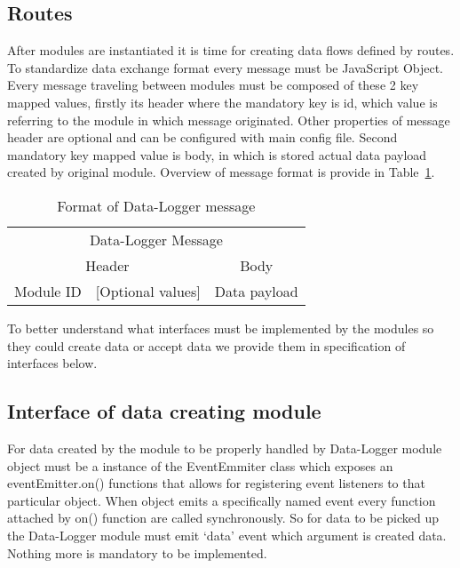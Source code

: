 \subsection{Routes} %
\label{sub:routes}
After modules are instantiated it is time for creating data flows defined by routes. To standardize data exchange format every message must be JavaScript Object. Every message traveling between modules must be composed of these 2 key mapped values, firstly its header where the mandatory key is id, which value is referring to the module in which message originated. Other properties of message header are optional and can be configured with main config file. Second mandatory key mapped value is body, in which is stored actual data payload created by original module. Overview of message format is provide in Table~\ref{tab:tab7}.
\begin{table}[H]
 \begin{center}
   \begin{tabular}{l l l l}
   \toprule
   \multicolumn{4}{c}{Data-Logger Message}\\
   \multicolumn{2}{c}{Header} & \multicolumn{2}{c}{Body} \\
   \midrule
   Module ID & [Optional values] & \multicolumn{2}{c}{Data payload}\\   
   \end{tabular}
 \end{center}
 \caption{Format of Data-Logger message}
 \label{tab:tab7}
\end{table}
To better understand what interfaces must be implemented by the modules so they could create data or accept data we provide them in specification of interfaces below.
\subsection{Interface of data creating module} %
\label{ssub:interface_of_data_creating_module}
For data created by the module to be properly handled by Data-Logger module object must be a instance of the EventEmmiter class which exposes an eventEmitter.on() functions that allows for registering event listeners to that particular object. When object emits a specifically named event every function attached by on() function are called synchronously. So for data to be picked up the Data-Logger module must emit `data' event which argument is created data. Nothing more is mandatory to be implemented.

